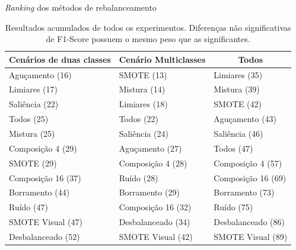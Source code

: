 \documentclass{beamer}
\begin{document}
\begin{frame}{\textit{Ranking} dos métodos de rebalanceamento}
  \setlength\leftmargini{1em}
  \begin{table}
    \centering
    \caption{Resultados acumulados de todos os experimentos. Diferenças não significativas de F1-Score possuem o mesmo peso que as significantes.}
    \tiny{
    \begin{tabular}{|l|l|l|}
      \hline
      \multicolumn{1}{|c|}{\textbf{Cenários de duas classes}} & \multicolumn{1}{c|}{\textbf{Cenário Multiclasses}} & \multicolumn{1}{c|}{\textbf{Todos}} \\ \hline
      Aguçamento (16)       & SMOTE (13)          & Limiares (35)                       \\ \hline
      Limiares (17)         & Mistura (14)        & Mistura (39)                        \\ \hline
      Saliência (22)        & Limiares (18)       & SMOTE (42)                          \\ \hline
      Todos (25)            & Todos (22)          & Aguçamento (43)                     \\ \hline
      Mistura (25)          & Saliência (24)      & Saliência (46)                      \\ \hline
      Composição 4 (29)     & Aguçamento (27)     & Todos (47)                          \\ \hline
      SMOTE (29)            & Composição 4 (28)   & Composição 4 (57)                   \\ \hline
      Composição 16 (37)    & Ruído (28)          & Composição 16 (69)                  \\ \hline
      Borramento (44)       & Borramento (29)     & Borramento (73)                     \\ \hline
      Ruído (47)            & Composição 16 (32)  & Ruído (75)                          \\ \hline
      SMOTE Visual (47)     & Desbalanceado (34)  & Desbalanceado (86)                  \\ \hline
      Desbalanceado (52)    & SMOTE Visual (42)   & SMOTE Visual (89)                   \\ \hline
    \end{tabular}
    }
  \end{table}
\end{frame}
\end{document}
